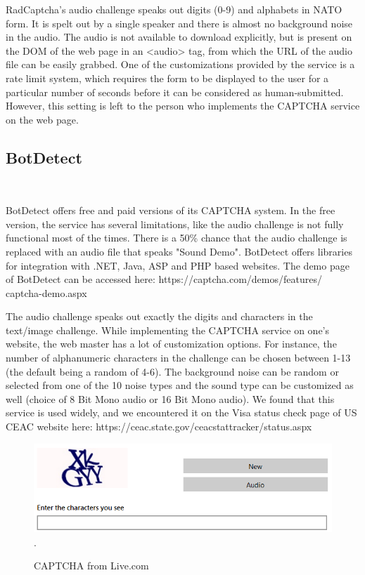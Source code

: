 RadCaptcha's audio challenge speaks out digits (0-9) and alphabets in NATO form. It is spelt out by a single speaker and there is almost no background noise in the audio. The audio is not available to download explicitly, but is present on the DOM of the web page in an <audio> tag, from which the URL of the audio file can be easily grabbed. One of the customizations provided by the service is a rate limit system, which requires the form to be displayed to the user for a particular number of seconds before it can be considered as human-submitted. However, this setting is left to the person who implements the CAPTCHA service on the web page.\newline

\subsection{BotDetect} \mbox{} \	

BotDetect offers free and paid versions of its CAPTCHA system. In the free version, the service has several limitations, like the audio challenge is not fully functional most of the times. There is a 50\% chance that the audio challenge is replaced with an audio file that speaks "Sound Demo". BotDetect offers libraries for integration with .NET, Java, ASP and PHP based websites. The demo page of BotDetect can be accessed here: https://captcha.com/demos/features/
captcha-demo.aspx\newline

The audio challenge speaks out exactly the digits and characters in the text/image challenge. While implementing the CAPTCHA service on one's website, the web master has a lot of customization options. For instance, the number of alphanumeric characters in the challenge can be chosen between 1-13 (the default being a random of 4-6). The background noise can be random or selected from one of the 10 noise types and the sound type can be customized as well (choice of 8 Bit Mono audio or 16 Bit Mono audio). We found that this service is used widely, and we encountered it on the Visa status check page of US CEAC website here: https://ceac.state.gov/ceacstattracker/status.aspx \newline

\begin{figure}[t]
   \centering
   \includegraphics[width=\columnwidth]{figures/live.PNG}.
   \caption{CAPTCHA from Live.com}
   \label{fig:speechrecognizers}
\end{figure}

